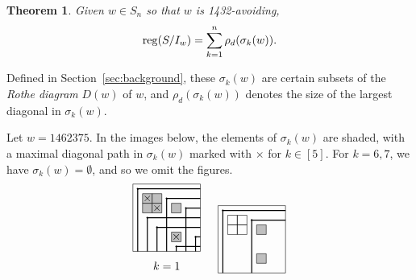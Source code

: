 \documentclass[12pt]{amsart}
\newtheorem{theorem}{Theorem}[section]
\theoremstyle{definition}
\newenvironment{example}
  {\pushQED{\qed}\renewcommand{\qedsymbol}{$\diamondsuit$}\examplex}
  {\popQED\endexamplex}
\theoremstyle{remark}
\numberwithin{equation}{section}
\newcommand{\Sym}{S}
\newcommand{\reg}{{\rm reg}}
\newcommand{\maxsizediag}{\rho_d}
\begin{document}
\begin{theorem}
\label{thm:1stmainTheorem}
	Given $w\in \Sym_n$ so that $w$ is 1432-avoiding, \[\reg(S/I_w)=\sum_{k=1}^n \maxsizediag(\sigma_k(w)).\]
\end{theorem}
\noindent Defined in Section~\ref{sec:background}, these $\sigma_k(w)$ are certain subsets of the \emph{Rothe diagram} $D(w)$ of $w$, and $\rho_d(\sigma_k(w))$ denotes the size of the largest diagonal in $\sigma_k(w)$. 


\begin{example}\label{ex:triangDecomp1432}
Let $w=1462375$.  In the images below, the elements of $\sigma_k(w)$ are shaded, with a maximal diagonal path in $\sigma_k(w)$ marked with $\times$ for $k\in[5]$. For $k=6,7$, we have $\sigma_k(w)=\emptyset$, and so we omit the figures.  
\[
\begin{tikzpicture}[scale=.3]
	\draw (0,0) rectangle (7,7);
	\draw[fill=gray!50] (1,5) rectangle (2,6);
	\draw [fill=gray!50](1,4) rectangle (2,5);
	\draw [fill=gray!50](2,5) rectangle (3,6);
	\draw[fill=gray!50] (2,4) rectangle (3,5);
	\draw [fill=gray!50](4,4) rectangle (5,5);
	\draw[fill=gray!50] (4,1) rectangle (5,2);
	\filldraw (0.5,6.5) circle (.5ex);
	\draw[line width = .2ex] (0.5,0) -- (0.5,6.5) -- (7,6.5);
	\filldraw (3.5,5.5) circle (.5ex);
	\draw[line width = .2ex] (3.5,0) -- (3.5,5.5) -- (7,5.5);
	\filldraw (5.5,4.5) circle (.5ex);
	\draw[line width = .2ex] (5.5,0) -- (5.5,4.5) -- (7,4.5);
	\filldraw (1.5,3.5) circle (.5ex);
	\draw[line width = .2ex] (1.5,0) -- (1.5,3.5) -- (7,3.5);
	\filldraw (2.5,2.5) circle (.5ex);
	\draw[line width = .2ex] (2.5,0) -- (2.5,2.5) -- (7,2.5);
	\filldraw (6.5,1.5) circle (.5ex);
	\draw[line width = .2ex] (6.5,0) -- (6.5,1.5) -- (7,1.5);
	\filldraw (4.5,0.5) circle (.5ex);
	\draw[line width = .2ex] (4.5,0) -- (4.5,0.5) -- (7,0.5);
	\node[] at (3.5,-1.5){$k=1$};
    \node[] at (1.5,5.5){$\times$};
	\node[] at (2.5,4.5){$\times$};
	\node[] at (4.5,1.5){$\times$};
\end{tikzpicture}
\hspace{1.5em}
\begin{tikzpicture}[scale=.3]
	\draw (0,0) rectangle (7,7);
	\draw (1,5) rectangle (2,6);
	\draw (1,4) rectangle (2,5);
	\draw (2,5) rectangle (3,6);
	\draw (2,4) rectangle (3,5);
	\draw[fill=gray!50] (4,4) rectangle (5,5);
	\draw[fill=gray!50] (4,1) rectangle (5,2);
	\filldraw (0.5,6.5) circle (.5ex);
	\draw[line width = .2ex] (0.5,0) -- (0.5,6.5) -- (7,6.5);
	\filldraw (3.5,5.5) circle (.5ex);
	\draw[line width = .2ex] (3.5,0) -- (3.5,5.5) -- (7,5.5);

\end{tikzpicture}\]
\end{example}
\end{document}
